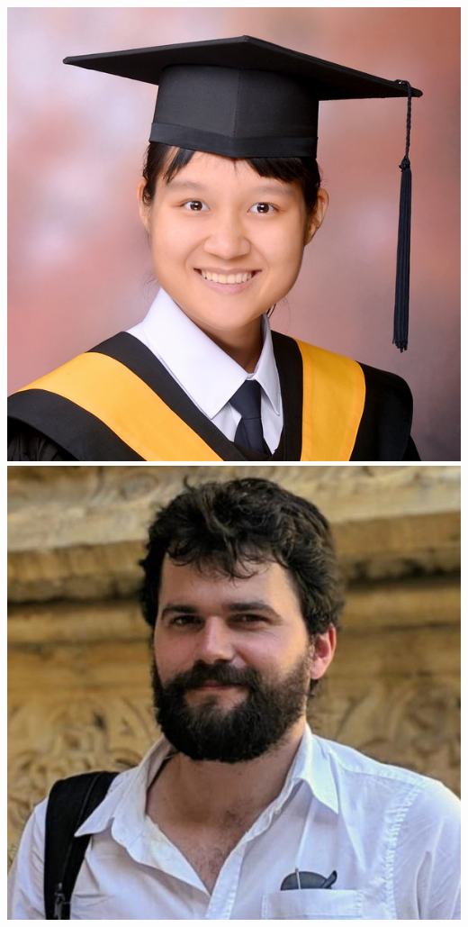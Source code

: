 \documentclass[aspectratio=169]{beamer}
\begin{document}
\begin{frame}
{        \includegraphics[width=0.09\textheight]{people/wei-ning_deng.jpg}%
        \includegraphics[width=0.09\textheight]{people/will_handley.jpg}%
}
\end{frame}
\end{document}
